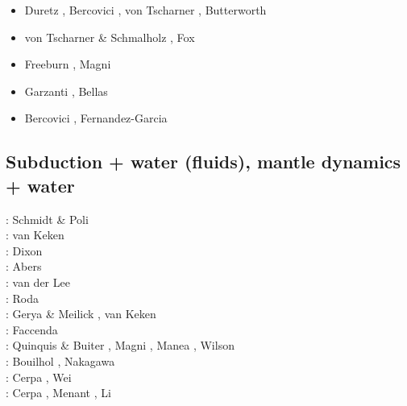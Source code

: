 \begin{scriptsize}
\begin{itemize}
\item[\twothousandfourteen] Duretz \etal \cite{dugs14}, Bercovici \etal \cite{besr14},
                            von Tscharner \etal \cite{vosd14}, Butterworth \etal \cite{butm14}
\item[\twothousandfifteen] von Tscharner \& Schmalholz \cite{vosc15}, Fox \etal \cite{fohk15}
\item[\twothousandseventeen] Freeburn \etal \cite{frbm17}, Magni \etal \cite{maav17}
\item[\twothousandeighteen] Garzanti \etal \cite{garm18}, Bellas \etal \cite{bezb18}
\item[\twothousandnineteen] Bercovici \etal \cite{beml19}, Fernandez-Garcia \etal \cite{fegb19}
\end{itemize}
\end{scriptsize}

\subsection{Subduction + water (fluids), mantle dynamics + water}

\begin{scriptsize}
\nineteenninetyeight: Schmidt \& Poli \cite{scpo98} \\
\twothousandtwo: van Keken \etal \cite{vakp02}\\
\twothousandfour: Dixon \etal \cite{didb04}\\
\twothousandsix: Abers \etal \cite{abvk06}\\
\twothousandeight: van der Lee \etal \cite{vary08}\\
\twothousandten: Roda \etal \cite{roms10}\\
\twothousandeleven: Gerya \& Meilick \cite{geme11}, van Keken \etal \cite{vahs11}\\
\twothousandtwelve: Faccenda \etal \cite{fagm12}\\
\twothousandfourteen: Quinquis \& Buiter \cite{qubu14}, Magni \etal \cite{mabv14}, 
                      Manea \etal \cite{malg14}, Wilson \etal \cite{wisv14}\\
\twothousandfifteen: Bouilhol \etal \cite{bomv15}, Nakagawa \etal \cite{nani15}\\
\twothousandseventeen: Cerpa \etal \cite{ceww17}, Wei \etal \cite{wewv17}\\
\twothousandnineteen: Cerpa \etal \cite{ceww19}, Menant \etal \cite{meag19}, Li \etal \cite{ligc19}
\end{scriptsize}

